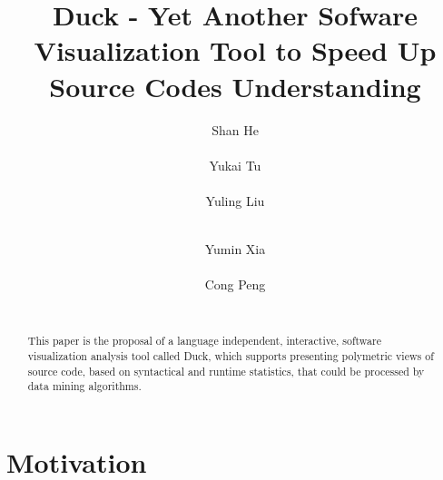 \documentclass{sig-alternate}
\begin{document}
\makeatletter
\def\@copyrightspace{\relax}
\makeatother


\title{
Duck - Yet Another Sofware Visualization Tool to Speed Up Source Codes Understanding
}

%
\author{
%
%
\alignauthor
Shan He\\
       \\
\alignauthor
Yukai Tu\\
       \\
\alignauthor
Yuling Liu\\
       \\
\and
\alignauthor
Yumin Xia\\
       \\
\alignauthor
Cong Peng\\
       \\
}

\maketitle
\begin{abstract}
This paper is the proposal of a language independent, interactive, software visualization analysis tool called Duck, which supports presenting polymetric views of source code, based on syntactical and runtime statistics, that could be processed by data mining algorithms.
\end{abstract}

\section{Motivation}
\end{document}
